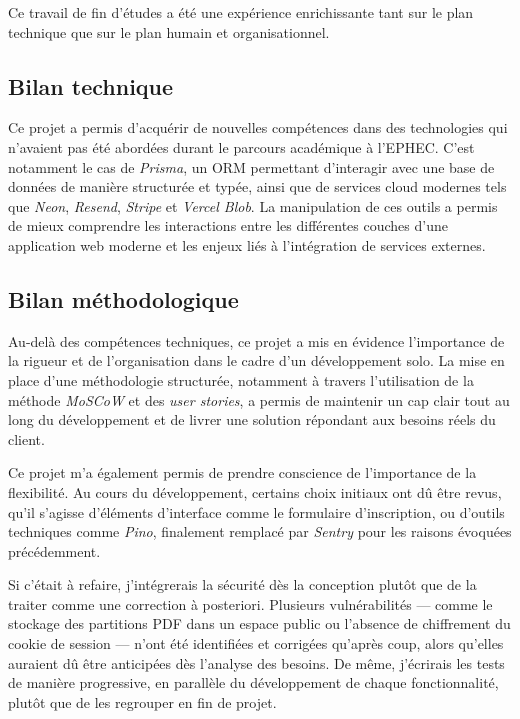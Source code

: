 \documentclass{article}
\begin{document}
Ce travail de fin d'études a été une expérience enrichissante tant 
sur le plan technique que sur le plan humain et organisationnel.

\subsection*{Bilan technique}

Ce projet a permis d'acquérir de nouvelles compétences dans des 
technologies qui n'avaient pas été abordées durant le parcours 
académique à l'EPHEC. C'est notamment le cas de \textit{Prisma}, 
un ORM permettant d'interagir avec une base de données de manière 
structurée et typée, ainsi que de services cloud modernes tels que 
\textit{Neon}, \textit{Resend}, \textit{Stripe} et 
\textit{Vercel Blob}. La manipulation de ces outils a permis de 
mieux comprendre les interactions entre les différentes couches 
d'une application web moderne et les enjeux liés à l'intégration 
de services externes.

\subsection*{Bilan méthodologique}

Au-delà des compétences techniques, ce projet a mis en évidence 
l'importance de la rigueur et de l'organisation dans le cadre d'un 
développement solo. La mise en place d'une méthodologie structurée, 
notamment à travers l'utilisation de la méthode \textit{MoSCoW} et 
des \textit{user stories}, a permis de maintenir un cap clair tout 
au long du développement et de livrer une solution répondant aux 
besoins réels du client.

Ce projet m'a également permis de prendre conscience de
l'importance de la flexibilité. Au cours du développement,
certains choix initiaux ont dû être revus, qu'il s'agisse
d'éléments d'interface comme le formulaire d'inscription,
ou d'outils techniques comme \textit{Pino}, finalement
remplacé par \textit{Sentry} pour les raisons évoquées
précédemment.

Si c'était à refaire, j'intégrerais la sécurité dès la
conception plutôt que de la traiter comme une correction
à posteriori. Plusieurs vulnérabilités — comme le stockage
des partitions PDF dans un espace public ou l'absence
de chiffrement du cookie de session — n'ont été identifiées
et corrigées qu'après coup, alors qu'elles auraient dû être
anticipées dès l'analyse des besoins. De même, j'écrirais
les tests de manière progressive, en parallèle du
développement de chaque fonctionnalité, plutôt que de les
regrouper en fin de projet.
\end{document}
